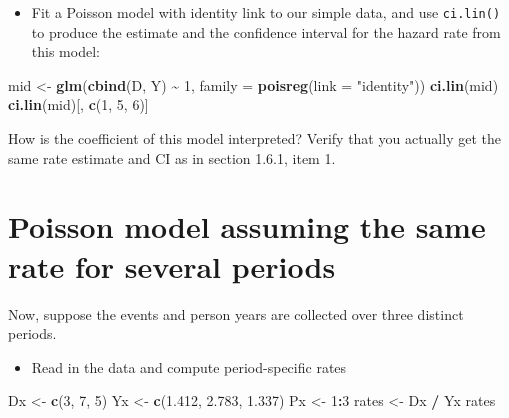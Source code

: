 \documentclass[
]{book}
\newenvironment{Shaded}{\begin{snugshade}}{\end{snugshade}}
\newcommand{\AttributeTok}[1]{\textcolor[rgb]{0.13,0.29,0.53}{#1}}
\newcommand{\DecValTok}[1]{\textcolor[rgb]{0.00,0.00,0.81}{#1}}
\newcommand{\FloatTok}[1]{\textcolor[rgb]{0.00,0.00,0.81}{#1}}
\newcommand{\FunctionTok}[1]{\textcolor[rgb]{0.13,0.29,0.53}{\textbf{#1}}}
\newcommand{\NormalTok}[1]{#1}
\newcommand{\OtherTok}[1]{\textcolor[rgb]{0.56,0.35,0.01}{#1}}
\newcommand{\SpecialCharTok}[1]{\textcolor[rgb]{0.81,0.36,0.00}{\textbf{#1}}}
\newcommand{\StringTok}[1]{\textcolor[rgb]{0.31,0.60,0.02}{#1}}
\providecommand{\tightlist}{%
  \setlength{\itemsep}{0pt}\setlength{\parskip}{0pt}}
\begin{document}
\begin{itemize}
\tightlist
\item
  Fit a Poisson model with identity link to our simple data, and
  use \texttt{ci.lin()} to produce the estimate and the
  confidence interval for the hazard rate from this model:
\end{itemize}

\begin{Shaded}
\begin{Highlighting}[]
\NormalTok{mid }\OtherTok{\textless{}{-}} \FunctionTok{glm}\NormalTok{(}\FunctionTok{cbind}\NormalTok{(D, Y) }\SpecialCharTok{\textasciitilde{}} \DecValTok{1}\NormalTok{, }\AttributeTok{family =} \FunctionTok{poisreg}\NormalTok{(}\AttributeTok{link =} \StringTok{"identity"}\NormalTok{))}
\FunctionTok{ci.lin}\NormalTok{(mid)}
\FunctionTok{ci.lin}\NormalTok{(mid)[, }\FunctionTok{c}\NormalTok{(}\DecValTok{1}\NormalTok{, }\DecValTok{5}\NormalTok{, }\DecValTok{6}\NormalTok{)]}
\end{Highlighting}
\end{Shaded}

How is the coefficient of this model interpreted?
Verify that you actually get the same rate estimate and CI as in section 1.6.1, item 1.

\section{Poisson model assuming the same rate for several periods}\label{poisson-model-assuming-the-same-rate-for-several-periods}

Now, suppose the events and person years are collected over three distinct periods.

\begin{itemize}
\tightlist
\item
  Read in the data and compute period-specific rates
\end{itemize}

\begin{Shaded}
\begin{Highlighting}[]
\NormalTok{Dx }\OtherTok{\textless{}{-}} \FunctionTok{c}\NormalTok{(}\DecValTok{3}\NormalTok{, }\DecValTok{7}\NormalTok{, }\DecValTok{5}\NormalTok{)}
\NormalTok{Yx }\OtherTok{\textless{}{-}} \FunctionTok{c}\NormalTok{(}\FloatTok{1.412}\NormalTok{, }\FloatTok{2.783}\NormalTok{, }\FloatTok{1.337}\NormalTok{)}
\NormalTok{Px }\OtherTok{\textless{}{-}} \DecValTok{1}\SpecialCharTok{:}\DecValTok{3}
\NormalTok{rates }\OtherTok{\textless{}{-}}\NormalTok{ Dx }\SpecialCharTok{/}\NormalTok{ Yx}
\NormalTok{rates}
\end{Highlighting}
\end{Shaded}
\end{document}
